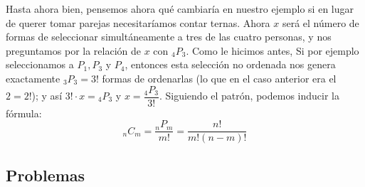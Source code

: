\documentclass[spanish]{report}
\newcommand{\comb}[2]{ {}_{#1}C_{#2}}
\newcommand{\perm}[2]{ {}_{#1}P_{#2}}
\begin{document}
Hasta ahora bien, pensemos ahora qué cambiaría en nuestro ejemplo si en lugar de querer tomar parejas necesitaríamos contar ternas. 
Ahora $x$ será el número de formas de seleccionar simultáneamente a tres de las cuatro personas, y nos preguntamos por la relación de $x$ con $\perm{4}{3}$.
Como le hicimos antes, Si por ejemplo seleccionamos a $P_1, P_3$ y $P_4$, entonces esta selección no ordenada nos genera exactamente $\perm{3}{3} = 3!$ formas de ordenarlas (lo que en el caso anterior era el $2=2!$); y así $3!\cdot x = \perm{4}{3}$ y $x = \dfrac{\perm{4}{3}}{3!}$.
Siguiendo el patrón, podemos inducir la fórmula: \[\comb{n}{m} = \frac{\perm{n}{m}}{m!} = \frac{n!}{m!(n-m)!} \]

\subsection{Problemas}
\end{document}
